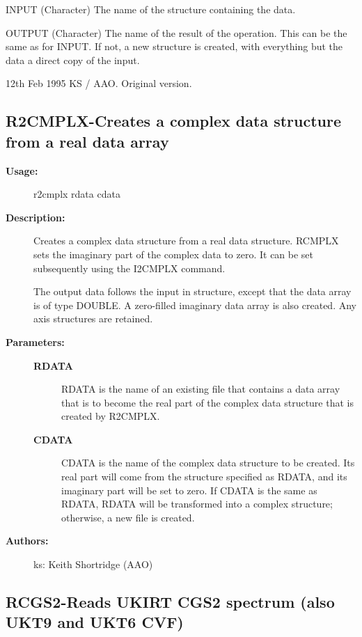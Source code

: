 \begin{description}
\begin{description}
\begin{terminalv}
    INPUT  (Character) The name of the structure containing the data.

    OUTPUT (Character) The name of the result of the operation.  This
           can be the same as for INPUT.  If not, a new structure
           is created, with everything but the data a direct
           copy of the input.

    12th Feb 1995  KS / AAO.  Original version.
\end{terminalv}
\end{description}
\subsection{R2CMPLX-\label{R2CMPLX}Creates a complex data structure from a real data array}
\begin{description}

\item [\textbf{Usage:}]
 r2cmplx rdata cdata

\item [\textbf{Description:}]
 Creates a complex data structure from a real data structure.
 RCMPLX sets the imaginary part of the complex data to
 zero.  It can be set subsequently using the I2CMPLX command.

 The output data follows the input in structure, except that the
 data array is of type DOUBLE.  A zero-filled imaginary data array
 is also created. Any axis structures are retained.

\item [\textbf{Parameters:}]
\begin{description}
\item [\textbf{RDATA}]
 RDATA is the name of an existing file that contains a data
 array that is to become the real part of the complex data
 structure that is created by R2CMPLX.
\item [\textbf{CDATA}]
 CDATA is the name of the complex data structure to be created.
 Its real part will come from the structure specified as RDATA,
 and its imaginary part will be set to zero.  If CDATA is the
 same as RDATA, RDATA will be transformed into a complex
 structure; otherwise, a new file is created.
\end{description}

\item [\textbf{Authors:}]
 ks: Keith Shortridge (AAO)
\end{description}
\subsection{RCGS2-\label{RCGS2}Reads UKIRT CGS2 spectrum (also UKT9 and UKT6 CVF)}
\begin{description}


\end{description}
\end{description}
